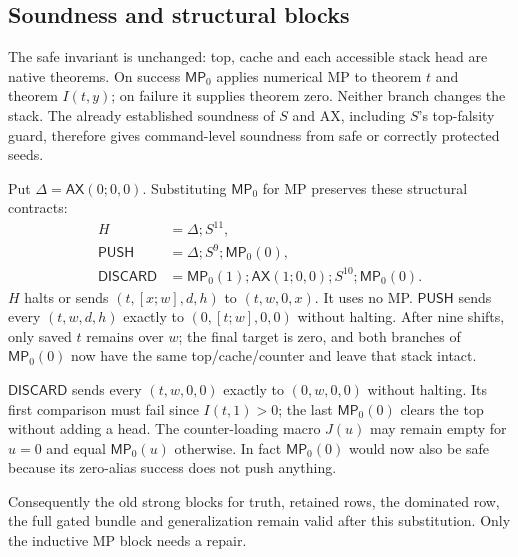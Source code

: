\documentclass[11pt]{article}
\newcommand{\MP}{\mathsf{MP}_0}
\newcommand{\AX}{\mathsf{AX}}
\newcommand{\PUSH}{\mathsf{PUSH}}
\newcommand{\DISCARD}{\mathsf{DISCARD}}
\begin{document}
\subsection*{Soundness and structural blocks}
The safe invariant is unchanged: top, cache and each accessible stack head are native theorems. On success $\MP$ applies numerical MP to theorem $t$ and theorem $I(t,y)$; on failure it supplies theorem zero. Neither branch changes the stack. The already established soundness of $S$ and AX, including $S$'s top-falsity guard, therefore gives command-level soundness from safe or correctly protected seeds.

Put $\Delta=\AX(0;0,0)$. Substituting $\MP$ for MP preserves these structural contracts:
\begin{align*}
 H&=\Delta;S^{11},\\
 \PUSH&=\Delta;S^9;\MP(0),\\
 \DISCARD&=\MP(1);\AX(1;0,0);S^{10};\MP(0).
\end{align*}
$H$ halts or sends $(t,[x;w],d,h)$ to $(t,w,0,x)$. It uses no MP. $\PUSH$ sends every $(t,w,d,h)$ exactly to $(0,[t;w],0,0)$ without halting. After nine shifts, only saved $t$ remains over $w$; the final target is zero, and both branches of $\MP(0)$ now have the same top/cache/counter and leave that stack intact.

$\DISCARD$ sends every $(t,w,0,0)$ exactly to $(0,w,0,0)$ without halting. Its first comparison must fail since $I(t,1)>0$; the last $\MP(0)$ clears the top without adding a head. The counter-loading macro $J(u)$ may remain empty for $u=0$ and equal $\MP(u)$ otherwise. In fact $\MP(0)$ would now also be safe because its zero-alias success does not push anything.

Consequently the old strong blocks for truth, retained rows, the dominated row, the full gated bundle and generalization remain valid after this substitution. Only the inductive MP block needs a repair.
\end{document}
